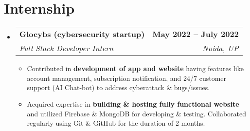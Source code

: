 \documentclass[letterpaper,11pt]{article}
\makeatletter
\newcommand{\resumeItem}[1]{
  \item\small{
    {#1 \vspace{-2pt}}
  }
}
\newcommand{\resumeSubheading}[4]{
  \vspace{-2pt}\item
    \begin{tabular*}{1.0\textwidth}[t]{l@{\extracolsep{\fill}}r}
      \textbf{#1} & \textbf{\small #2} \\
      \textit{\small#3} & \textit{\small #4} \\
    \end{tabular*}\vspace{-7pt}
}
\newcommand{\resumeSubHeadingListStart}{\begin{itemize}[leftmargin=0.0in, label={}]}
\newcommand{\resumeSubHeadingListEnd}{\end{itemize}}
\newcommand{\resumeItemListStart}{\begin{itemize}}
\newcommand{\resumeItemListEnd}{\end{itemize}\vspace{-5pt}}
\makeatother
\begin{document}


\section{Internship}
  \resumeSubHeadingListStart

    \resumeSubheading
      {Glocybs (cybersecurity startup)}{May 2022 -- July 2022}
      {Full Stack Developer Intern}{Noida, UP}
      \resumeItemListStart
        \resumeItem{Contributed in \textbf{development of app and website} having features like account management, subscription notification, and 24/7 customer support (AI Chat-bot) to address cyberattack \& bugs/issues.}
        \resumeItem{Acquired expertise in \textbf{building \& hosting fully functional website} and utilized Firebase \& MongoDB for developing \& testing. Collaborated regularly using Git \& GitHub for the duration of 2 months.}
      \resumeItemListEnd
    
  \resumeSubHeadingListEnd
\vspace{-16pt}

\end{document}
